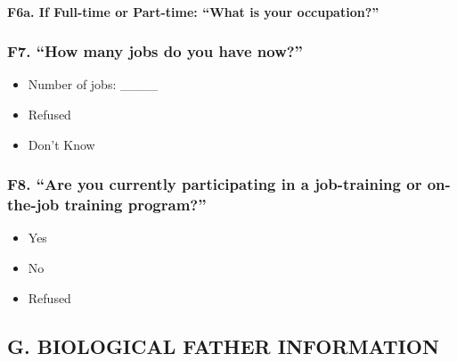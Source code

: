 \documentclass[
  12pt,
]{book}
\providecommand{\tightlist}{%
  \setlength{\itemsep}{0pt}\setlength{\parskip}{0pt}}
\begin{document}
\hypertarget{f6a.-if-full-time-or-part-time-what-is-your-occupation}{%
\paragraph*{F6a. If Full-time or Part-time: ``What is your occupation?''}\label{f6a.-if-full-time-or-part-time-what-is-your-occupation}}

\hypertarget{f7.-how-many-jobs-do-you-have-now}{%
\subsubsection*{F7. ``How many jobs do you have now?''}\label{f7.-how-many-jobs-do-you-have-now}}

\begin{itemize}
\tightlist
\item
  Number of jobs: \_\_\_\_
\item
  Refused
\item
  Don't Know
\end{itemize}

\hypertarget{f8.-are-you-currently-participating-in-a-job-training-or-on-the-job-training-program}{%
\subsubsection*{F8. ``Are you currently participating in a job-training or on-the-job training program?''}\label{f8.-are-you-currently-participating-in-a-job-training-or-on-the-job-training-program}}

\begin{itemize}
\tightlist
\item
  Yes
\item
  No
\item
  Refused
\end{itemize}

\hypertarget{g.-biological-father-information}{%
\subsection*{G. BIOLOGICAL FATHER INFORMATION}\label{g.-biological-father-information}}
\end{document}
